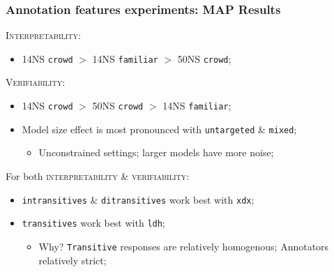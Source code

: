 \documentclass[xcolor={dvipsnames}]{beamer}
\newcommand{\feat}[1]{\textsc{#1}}
\newcommand{\param}[1]{\texttt{#1}}
\begin{document}
\begin{frame}
\frametitle{Annotation features experiments: MAP Results}
\vspace{-.5em}
\pause
\feat{Interpretability}:
\begin{itemize}
\pause
\item 14NS \param{crowd} $>$ 14NS \param{familiar} $>$ 50NS \param{crowd};
\end{itemize}

\vspace{1em}

\pause
\feat{Verifiability}:
\begin{itemize}
\pause
\item 14NS \param{crowd} $>$ 50NS \param{crowd} $>$ 14NS \param{familiar};
\pause
\item Model size effect is most pronounced with \param{untargeted} \& \param{mixed};
\begin{itemize}
\pause
\item Unconstrained settings; larger models have more noise;
\end{itemize}
\end{itemize}

\vspace{1em}

\pause
For both \feat{interpretability} \& \feat{verifiability}:
\begin{itemize}
\pause
\item \param{intransitives} \& \param{ditransitives} work best with \param{xdx};
\pause
\item \param{transitives} work best with \param{ldh};
\begin{itemize}
\pause
\item Why? \param{Transitive} responses are relatively homogenous; Annotators relatively strict;
\end{itemize}
\end{itemize}
\end{frame}
\end{document}
